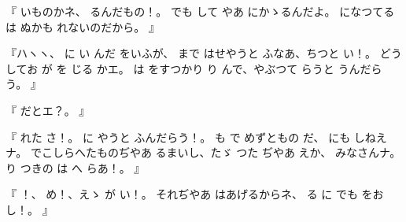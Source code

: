 『
いものかネ、
るんだもの！。
でも
して
やあ
にかゝるんだよ。
になつてる
は
ぬかも
れないのだから。
』

『ハヽヽ、
に
い
んだ
をいふが、
まで
はせやうと
ふなあ、ちつと
い！。
どうしてお
が
を
じる
かエ。
は
をすつかり
り
んで、やぶつて
らうと
うんだらう。
』

『
だとエ？。
』

『
れた
さ！。
に
やうと
ふんだらう！。
も
で
めずともの
だ、
にも
しねえナ。
でこしらへたものぢやあ
るまいし、たゞ
つた
ぢやあ
えか、
みなさんナ。
り
つきの
は
へ
らあ！。
』

『
！、
め！、えゝ
が
い！。
それぢやあ
はあげるからネ、
る
に
でも
をお
し！。
』

